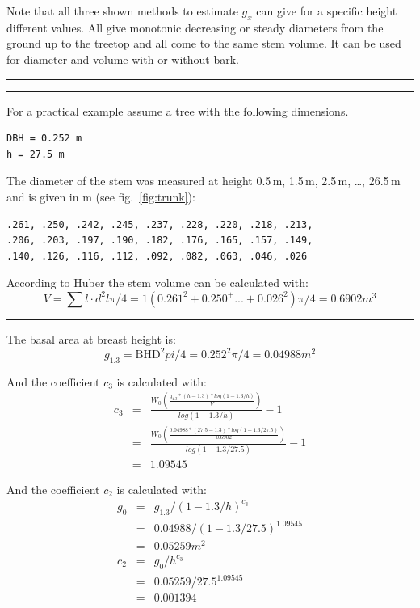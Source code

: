 \documentclass[twocolumn,10pt]{article}
\begin{document}
Note that all three shown methods to estimate $g_x$ can give for a specific
height different values. All give monotonic decreasing or steady diameters from
the ground up to the treetop and all come to the same stem volume. It can be
used for diameter and volume with or without bark.

\par\noindent\rule{\columnwidth}{0.5pt}
\par\noindent\rule{\columnwidth}{0.5pt}

For a practical example assume a tree with the following dimensions.
\begin{verbatim}
DBH = 0.252 m
h = 27.5 m
\end{verbatim}

The diameter of the stem was measured at height 0.5\,m, 1.5\,m, 2.5\,m, \dots,
26.5\,m and is given in m (see fig.~\ref{fig:trunk}):
\begin{verbatim}
.261, .250, .242, .245, .237, .228, .220, .218, .213,
.206, .203, .197, .190, .182, .176, .165, .157, .149,
.140, .126, .116, .112, .092, .082, .063, .046, .026
\end{verbatim}

According to Huber the stem volume can be calculated with:
$$V = \sum l \cdot d^2l\pi/4 = 1(0.261^2 + 0.250^ + ... + 0.026^2)\pi/4 = 0.6902m^3$$

\par\noindent\rule{\columnwidth}{0.5pt}

The basal area at breast height is:
$$ g_{1.3} = \text{BHD}^2pi/4 = 0.252^2\pi/4 = 0.04988m^2$$

And the coefficient $c_3$ is calculated with:
\begin{eqnarray*}
c_3 & = & \frac{W_0\left(\frac{g_{1.3}*(h-1.3)*log(1-1.3/h)}{V}\right)}{log(1 - 1.3/h)} - 1\\
 & = & \frac{W_0\left(\frac{0.04988*(27.5-1.3)*log(1-1.3/27.5)}{0.6902}\right)}{log(1 - 1.3/27.5)} - 1\\
  & = & 1.09545
\end{eqnarray*}

And the coefficient $c_2$ is calculated with:
\begin{eqnarray*}
g_0 & = & g_{1.3} / (1-1.3/h)^{c_3}\\
 & = & 0.04988 / (1-1.3/27.5)^{1.09545}\\
 & = & 0.05259m^2 \\
c_2 & = & g_0 / h^{c_3}\\
 & = & 0.05259 / 27.5^{1.09545}\\
 & = & 0.001394
\end{eqnarray*}
\end{document}
